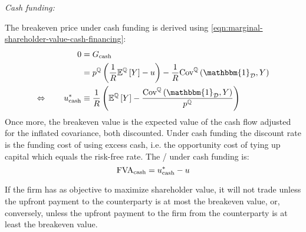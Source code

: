 \documentclass[main.tex]{subfiles}
\begin{document}
            \noindent
            \textit{Cash funding:} \par
            The breakeven price under cash funding is derived using
            \cref{eqn:marginal-shareholder-value-cash-financing}:
                \begin{align}
                    0 &= G_{\text{cash}} 
                        \nonumber \\
                    &=
                        p^{\mathbb{Q}} \left(
                            \discountfactor
                            \mathbb{E}^{\mathbb{Q}}\left[Y\right]
                            - u
                        \right)
                        -
                        \discountfactor
                        \text{Cov}^{\mathbb{Q}}\left(\mathbbm{1}_{\mathcal{D}}, Y\right) 
                        \nonumber \\
                    \Leftrightarrow \qquad
                    u_{\text{cash}}^{\ast}
                    &\equiv
                        \discountfactor
                        \left(
                            \mathbb{E}^{\mathbb{Q}}\left[Y\right]
                            -
                            \frac{
                                \text{Cov}^{\mathbb{Q}}\left(\mathbbm{1}_{\mathcal{D}}, Y\right)
                            }{
                                p^{\mathbb{Q}}  
                            }  
                        \right)
                    \label{eqn:shareholdes-breakeven-cash-financing}
                \end{align}
            Once more, the breakeven value is the expected value of the cash flow
            adjusted for the inflated covariance, both discounted. 
            Under cash funding the discount rate is the funding cost of using excess cash,
            i.e. the opportunity cost of tying up capital which equals the risk-free rate.
            The \FVA/ under cash funding is:
                \begin{equation}
                    \FVA/_{\text{cash}} 
                        = u^{\ast}_{\text{cash}} - u
                    \label{eqn:fva-cash-financing}
                \end{equation}

            If the firm has as objective to maximize shareholder value, 
            it will not trade unless the upfront payment to the counterparty is at most the breakeven value,
            or, conversely, unless the upfront payment to the firm from the counterparty is at least the breakeven value.
\end{document}

